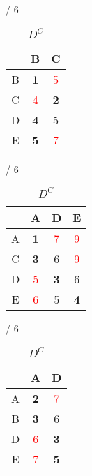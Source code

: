 \documentclass[a4paper, 11 pt, article, accentcolor=tud7b]{tudreport}
\begin{document}
	\begin{table}[h]
	  \begin{subtable}[b]{\textwidth / 6}
	    \begin{tabular}{| c | c | c |}
	      \hline
	        & B                   & C          \\ \hline
	      B & \textbf{1}          & \textcolor{red}{5} \\ \hline
	      C & \textcolor{red}{4}          & \textbf{2} \\ \hline
	      D & \textbf{4}          & 5          \\ \hline
	      E & \textbf{5}          & \textcolor{red}{7} \\ \hline
	    \end{tabular}
	    \caption{$D^{A}$}
	  \end{subtable}
	  \hfill
	  \begin{subtable}[b]{\textwidth / 6}
	    \begin{tabular}{| c | c | c | c |}
	    \hline
	      & A                   & D                  & E                  \\ \hline
	    A & \textbf{1}          & \textcolor{red}{7} & \textcolor{red}{9} \\ \hline
	    C & \textbf{3}          & 6                  & \textcolor{red}{9} \\ \hline
	    D & \textcolor{red}{5}  & \textbf{3}         & 6                  \\ \hline
	    E & \textcolor{red}{6}  & 5                  & \textbf{4}         \\ \hline
	    \end{tabular}
	    \caption{$D^{B}$}
	  \end{subtable}
	  \hfill
	  \begin{subtable}[b]{\textwidth / 6}
	    \begin{tabular}{| c | c | c |}
	    \hline
	      & A                   & D                  \\ \hline
	    A & \textbf{2}          & \textcolor{red}{7} \\ \hline
	    B & \textbf{3}          & 6                  \\ \hline
	    D & \textcolor{red}{6}  & \textbf{3}         \\ \hline
	    E & \textcolor{red}{7}  & \textbf{5}         \\ \hline
	    \end{tabular}
	    \caption{$D^{C}$}
	  \end{subtable}

\end{table}
\end{document}

